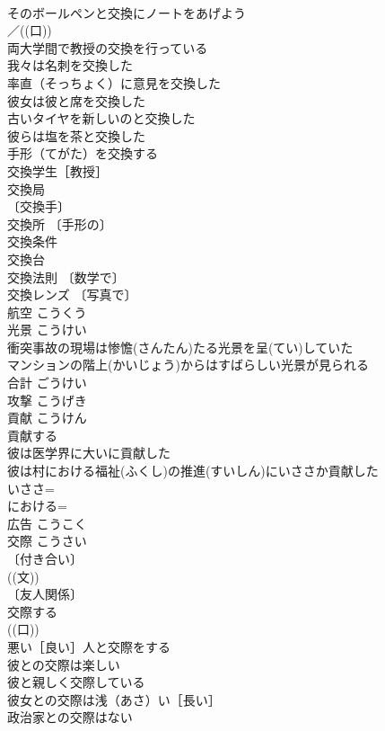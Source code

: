 \documentclass[8pt]{extreport}
\begin{document}
\begin{CJK}{UTF8}{min}
\\	そのボールペンと交換にノートをあげよう 
\\	／((口)) 
\\	両大学間で教授の交換を行っている 
\\	我々は名刺を交換した 
\\	率直（そっちょく）に意見を交換した 
\\	彼女は彼と席を交換した 
\\	古いタイヤを新しいのと交換した 
\\	彼らは塩を茶と交換した 
\\	手形（てがた）を交換する 
\\	交換学生［教授］ 
\\	交換局 
\\	〔交換手〕
\\	交換所 〔手形の〕
\\	交換条件 
\\	交換台 
\\	交換法則 〔数学で〕
\\	交換レンズ 〔写真で〕
\\	航空	こうくう	
\\	光景	こうけい	
\\	衝突事故の現場は惨憺(さんたん)たる光景を呈(てい)していた 
\\	マンションの階上(かいじょう)からはすばらしい光景が見られる 
\\	合計	ごうけい	
\\	攻撃	こうげき	
\\	貢献	こうけん	
\\	貢献する 
\\	彼は医学界に大いに貢献した 
\\	彼は村における福祉(ふくし)の推進(すいしん)にいささか貢献した 
\\	いささ=
\\	における=
\\	広告	こうこく	
\\	交際	こうさい	
\\	〔付き合い〕
\\	((文)) 
\\	〔友人関係〕
\\	交際する 
\\	((口)) 
\\	悪い［良い］人と交際をする 
\\	彼との交際は楽しい 
\\	彼と親しく交際している 
\\	彼女との交際は浅（あさ）い［長い］ 
\\	政治家との交際はない 

\end{CJK}
\end{document}
